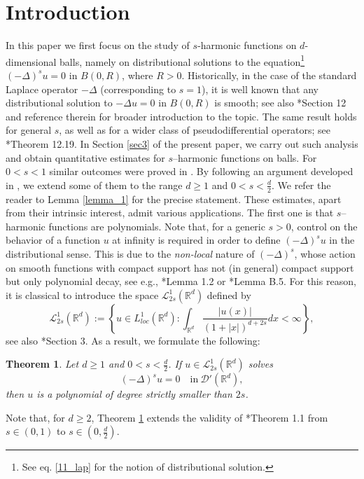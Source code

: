 \documentclass[letterpaper, 11pt,  reqno]{amsart}
\newtheorem{theorem}{Theorem}[section]
\theoremstyle{definition}
\theoremstyle{remark}
\numberwithin{equation}{section}
\newcommand{\bbr}{\mathbb{R}}
\newcommand{\R}{{\mathbb R}}
\begin{document}
\section{Introduction}
In this paper we first focus on the study of $s$-harmonic functions on $d$-dimensional balls, namely on {distributional solutions} to the equation\footnote{See eq. \eqref{11_lap} for the notion of distributional solution.} $(-\Delta)^{s}u=0$ in $B(0,R)$, where 
 $R>0$. Historically, in the case of the standard Laplace operator $-\Delta$  (corresponding to $s=1$), it is well known \cite{hypo} that any distributional solution to $-\Delta u=0$ in $B(0,R)$ is smooth; see also \cite{garofalo}*{Section 12} and reference therein for broader introduction to the topic. 
 The same result holds for general $s$, as well as for a wider class of pseudodifferential operators; see \cite{garofalo}*{Theorem 12.19}. In Section \ref{sec3} of the present paper, we carry out such analysis and obtain quantitative estimates for $s$--harmonic functions on balls.  For $0<s<1$ similar outcomes were proved in \cites{BBK2,entire}. By following an argument developed in \cite{orbital}, we  extend some of them to the range $d\ge 1$ and  $0<s<\tfrac{d}{2}$. 
We refer the reader to Lemma \ref{lemma_1} for the precise statement. These estimates, apart from their intrinsic interest, admit various applications. 
The first one is that $s$--harmonic functions are polynomials. Note that, for a generic $s>0$, control on the behavior of a function $u$ at infinity is required in order to define $(-\Delta)^{s}u$ in the distributional sense. This is due to the \textit{non-local} nature of $(-\Delta)^s$, whose action on smooth functions with compact support has not (in general) compact support but only polynomial decay, see e.g., \cite{mazya}*{Lemma 1.2} or \cite{Abatangelo_1}*{Lemma B.5}. For this reason, it is classical to introduce the space $\mathscr{L}^{1}_{2s}(\R^d)$ defined by 
\begin{equation}\label{L_pesato}
\mathscr{L}^{1}_{2s}(\bbr^d):=\left\{u\in L^1_{loc}(\bbr^d):\int_{\bbr^d}\frac{|u(x)|}{(1+|x|)^{d+2s}}dx<\infty\right\},
	\end{equation}
see also \cite{BBK}*{Section 3}.
As a result, we formulate the following:
\begin{theorem}\label{poli}
	Let $d\ge 1$ and $0<s<\frac{d}{2}$. If  $u\in \mathscr{L}^{1}_{2s}(\R^d)$ solves 
	\begin{equation*}\label{eq_001}
		(-\Delta)^{s}u=0\quad \text{in}\ \mathscr{D}'(\R^d),
	\end{equation*}
	then $u$ is a polynomial of degree strictly smaller than $2s$.
\end{theorem}
\noindent
Note that, for $d\ge 2$,  Theorem \ref{poli} extends the validity of \cite{entire}*{Theorem 1.1}  from $s\in (0,1)$ to  $s\in (0,\tfrac{d}{2})$.
\end{document}
